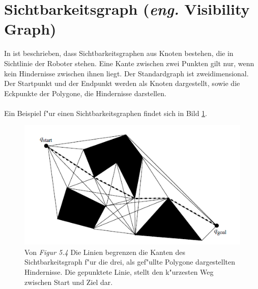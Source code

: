 \section{Sichtbarkeitsgraph (\textit{eng.} Visibility Graph)}
%
%
In \cite{Principles:05} ist beschrieben, dass Sichtbarkeitsgraphen aus Knoten bestehen, die in Sichtlinie der Roboter stehen. Eine Kante zwischen zwei Punkten gilt nur, wenn kein Hindernisse zwischen ihnen liegt. Der Standardgraph ist zweidimensional. Der Startpunkt und der Endpunkt werden als Knoten dargestellt, sowie die Eckpunkte der Polygone, die Hindernisse darstellen.
\\\\
Ein Beispiel f"ur einen Sichtbarkeitsgraphen findet sich in Bild \ref{sec3a}.
\begin{figure} %
	\centering
	\includegraphics[width=\textwidth]{images/Robot_Motion_Visibility_Graph.png}
	\caption{Von \cite[~S. 111]{Principles:05} \textit{Figur 5.4} Die Linien begrenzen die Kanten des Sichtbarkeitsgraph f"ur die drei, als gef"ullte Polygone dargestellten Hindernisse. Die gepunktete Linie, stellt den k"urzesten Weg zwischen Start und Ziel dar.}
	\label{sec3a}
\end{figure}


